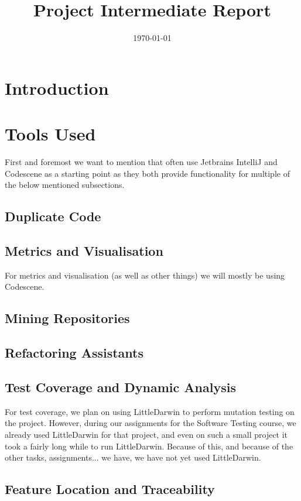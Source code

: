 \documentclass{article}
\title{\textmd{\textbf{Project Intermediate Report}}\\\normalsize\vspace{0.1in}\Large{\projectnaam}}
\author{\student}\date{\today}
\begin{document}
\maketitle
\newpage

\section{Introduction}

\section{Tools Used}

First and foremost we want to mention that often use Jetbrains IntelliJ and Codescene as a starting point as they both provide functionality for multiple of the below mentioned subsections.

\subsection{Duplicate Code}
\subsection{Metrics and Visualisation}

For metrics and visualisation (as well as other things) we will mostly be using Codescene.

\subsection{Mining Repositories}
\subsection{Refactoring Assistants}
\subsection{Test Coverage and Dynamic Analysis}

For test coverage, we plan on using LittleDarwin to perform mutation testing on the project. However, during our assignments for the Software Testing course, we already used LittleDarwin for that project, and even on such a small project it took a fairly long while to run LittleDarwin. Because of this, and because of the other tasks, assignments... we have, we have not yet used LittleDarwin.

\subsection{Feature Location and Traceability}
\end{document}
